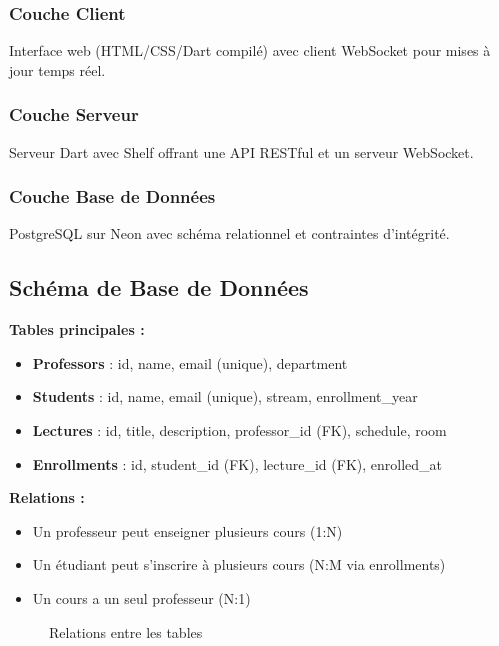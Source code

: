 \documentclass{article}
\begin{document}
\subsubsection{Couche Client}
Interface web (HTML/CSS/Dart compilé) avec client WebSocket pour mises à jour temps réel.

\subsubsection{Couche Serveur}
Serveur Dart avec Shelf offrant une API RESTful et un serveur WebSocket.

\subsubsection{Couche Base de Données}
PostgreSQL sur Neon avec schéma relationnel et contraintes d'intégrité.

\subsection{Schéma de Base de Données}

\textbf{Tables principales :}

\begin{itemize}
    \item \textbf{Professors} : id, name, email (unique), department
    \item \textbf{Students} : id, name, email (unique), stream, enrollment\_year
    \item \textbf{Lectures} : id, title, description, professor\_id (FK), schedule, room
    \item \textbf{Enrollments} : id, student\_id (FK), lecture\_id (FK), enrolled\_at
\end{itemize}

\textbf{Relations :}
\begin{itemize}
    \item Un professeur peut enseigner plusieurs cours (1:N)
    \item Un étudiant peut s'inscrire à plusieurs cours (N:M via enrollments)
    \item Un cours a un seul professeur (N:1)
\end{itemize}

\begin{figure}[H]
    \centering
    \caption{Relations entre les tables}
\end{figure}
\end{document}
